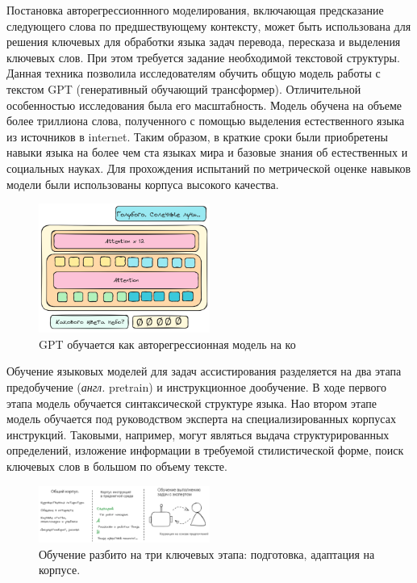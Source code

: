 Постановка авторегрессионнного моделирования, включающая предсказание следующего слова по предшествующему контексту,
может быть использована для решения ключевых для обработки языка задач перевода, пересказа и выделения ключевых слов. 
При этом требуется задание необходимой текстовой структуры. Данная техника позволила исследователям \cite{radford2021learning} обучить
общую модель работы с текстом GPT (генеративный обучающий трансформер). Отличительной особенностью исследования была его
масштабность. Модель обучена на объеме более триллиона слова, полученного с помощью выделения естественного языка из источников в internet.
Таким образом, в краткие сроки были приобретены навыки языка на более чем ста языках мира и базовые знания об естественных и социальных науках.
Для прохождения испытаний по метрической оценке навыков модели были использованы корпуса высокого качества. 

\begin{figure}[h]
    \centering
    \includegraphics[width=0.5\textwidth]{assets/ml/nlp/gpt.excalidraw.png}
    \caption{GPT обучается как авторегрессионная модель на ко}
    \label{gpt}
\end{figure}

Обучение языковых моделей для задач ассистирования разделяется на два этапа предобучение (\textit{англ.} pretrain) и инструкционное дообучение.
В ходе первого этапа модель обучается синтаксической структуре языка. Нао втором этапе модель обучается под руководством эксперта на 
специализированных корпусах инструкций. Таковыми, например, могут являться выдача структурированных определений, изложение информации в требуемой
стилистической форме, поиск ключевых слов в большом по объему тексте.

\begin{figure}[h]
    \centering
    \includegraphics[width=0.5\textwidth]{assets/work/arch/learning.excalidraw.png}
    \caption{Обучение разбито на три ключевых этапа: подготовка, адаптация на корпусе.}
    \label{train}
\end{figure}

